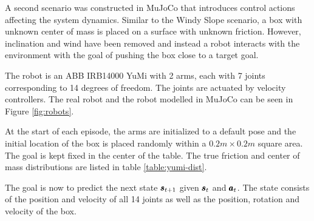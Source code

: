 A second scenario was constructed in MuJoCo that introduces control actions affecting the system dynamics. Similar to the Windy Slope scenario, a box with unknown center of mass is placed on a surface with unknown friction. However, inclination and wind have been removed and instead a robot interacts with the environment with the goal of pushing the box close to a target goal.

The robot is an ABB IRB14000 YuMi with 2 arms, each with 7 joints corresponding to 14 degrees of freedom. The joints are actuated by velocity controllers. The real robot and the robot modelled in MuJoCo can be seen in Figure \ref{fig:robots}. 

At the start of each episode, the arms are initialized to a default pose and the initial location of the box is placed randomly within a $0.2m \times 0.2m$ square area. The goal is kept fixed in the center of the table. The true friction and center of mass distributions are listed in table \ref{table:yumi-dist}.

The goal is now to predict the next state $\pmb{s}_{t+1}$ given $\pmb{s}_t$ and $\pmb{a}_t$. The state consists of the position and velocity of all 14 joints as well as the position, rotation and velocity of the box.



